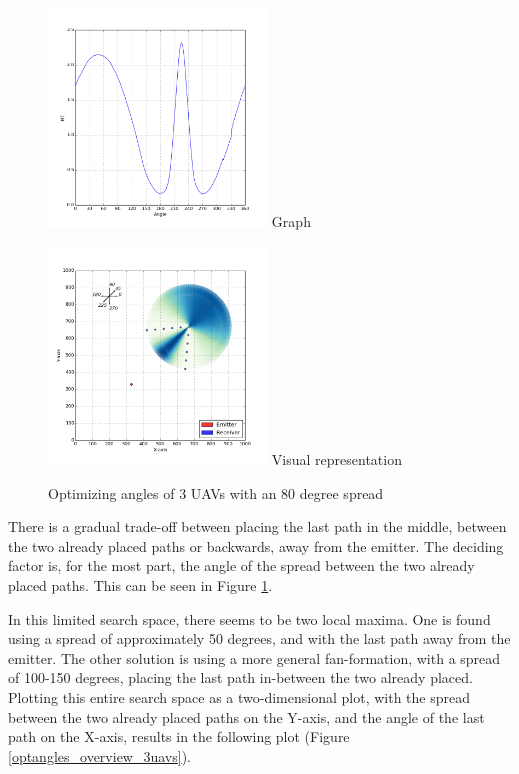 \documentclass[10pt,a4paper]{book}
\begin{document}
\begin{figure}[H]
\centering
\begin{minipage}{58mm}
  \centering
  \includegraphics[width=58mm]{optangles/3uavs5steps80deg_1.png}
  Graph
\end{minipage}%
\begin{minipage}{58mm}
  \centering
  \includegraphics[width=58mm]{optangles/3uavs5steps80deg_2.png}
  Visual representation
\end{minipage}
\caption{Optimizing angles of 3 \glspl{UAV} with an 80 degree spread}
\label{optangles_80deg_3uavs}
\end{figure}

There is a gradual trade-off between placing the last path in the middle, between the two already placed paths or backwards, away from the emitter. The deciding factor is, for the most part, the angle of the spread between the two already placed paths. This can be seen in Figure \ref{optangles_80deg_3uavs}.

In this limited search space, there seems to be two local maxima. One is found using a spread of approximately 50 degrees, and with the last path away from the emitter. The other solution is using a more general fan-formation, with a spread of 100-150 degrees, placing the last path in-between the two already placed. Plotting this entire search space as a two-dimensional plot, with the spread between the two already placed paths on the Y-axis, and the angle of the last path on the X-axis, results in the following plot (Figure \ref{optangles_overview_3uavs}).
\end{document}
